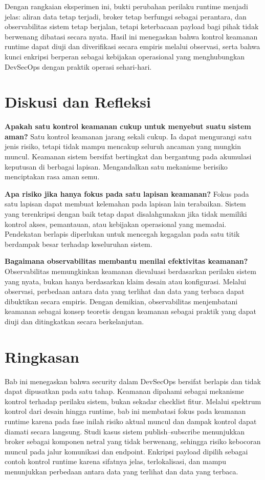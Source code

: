 Dengan rangkaian eksperimen ini, bukti perubahan perilaku runtime menjadi jelas: aliran data tetap terjadi, broker tetap berfungsi sebagai perantara, dan observabilitas sistem tetap berjalan, tetapi keterbacaan payload bagi pihak tidak berwenang dibatasi secara nyata. Hasil ini menegaskan bahwa kontrol keamanan runtime dapat diuji dan diverifikasi secara empiris melalui observasi, serta bahwa kunci enkripsi berperan sebagai kebijakan operasional yang menghubungkan DevSecOps dengan praktik operasi sehari-hari.



\section{Diskusi dan Refleksi}

\textbf{Apakah satu kontrol keamanan cukup untuk menyebut suatu sistem aman?}  
Satu kontrol keamanan jarang sekali cukup. Ia dapat mengurangi satu jenis risiko, tetapi tidak mampu mencakup seluruh ancaman yang mungkin muncul. Keamanan sistem bersifat bertingkat dan bergantung pada akumulasi keputusan di berbagai lapisan. Mengandalkan satu mekanisme berisiko menciptakan rasa aman semu.

\textbf{Apa risiko jika hanya fokus pada satu lapisan keamanan?}  
Fokus pada satu lapisan dapat membuat kelemahan pada lapisan lain terabaikan. Sistem yang terenkripsi dengan baik tetap dapat disalahgunakan jika tidak memiliki kontrol akses, pemantauan, atau kebijakan operasional yang memadai. Pendekatan berlapis diperlukan untuk mencegah kegagalan pada satu titik berdampak besar terhadap keseluruhan sistem.

\textbf{Bagaimana observabilitas membantu menilai efektivitas keamanan?}  
Observabilitas memungkinkan keamanan dievaluasi berdasarkan perilaku sistem yang nyata, bukan hanya berdasarkan klaim desain atau konfigurasi. Melalui observasi, perbedaan antara data yang terlihat dan data yang terbaca dapat dibuktikan secara empiris. Dengan demikian, observabilitas menjembatani keamanan sebagai konsep teoretis dengan keamanan sebagai praktik yang dapat diuji dan ditingkatkan secara berkelanjutan.



\section{Ringkasan}

Bab ini menegaskan bahwa security dalam DevSecOps bersifat berlapis dan tidak dapat dipusatkan pada satu tahap. Keamanan dipahami sebagai mekanisme kontrol terhadap perilaku sistem, bukan sekadar checklist fitur. Melalui spektrum kontrol dari desain hingga runtime, bab ini membatasi fokus pada keamanan runtime karena pada fase inilah risiko aktual muncul dan dampak kontrol dapat diamati secara langsung. Studi kasus sistem publish--subscribe menunjukkan broker sebagai komponen netral yang tidak berwenang, sehingga risiko kebocoran muncul pada jalur komunikasi dan endpoint. Enkripsi payload dipilih sebagai contoh kontrol runtime karena sifatnya jelas, terlokalisasi, dan mampu menunjukkan perbedaan antara data yang terlihat dan data yang terbaca.

